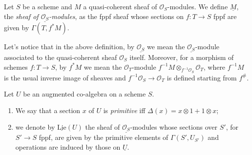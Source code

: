 \documentclass[../Main]{subfiles}
\begin{document}
\begin{defn}
	Let $S$ be a scheme and $M$ a quasi-coherent sheaf of $\mathcal{O}_{ S }$-modules.
	We define $\underline{M}$, the {\em sheaf of $\underline{\mathcal{O}_{ S }}$-modules},
	as the fppf sheaf whose sections on $f\colon T \to S$ fppf are given by
	$\Gamma(T, f^*M)$.
\end{defn}


\begin{rem}[]
	Let's notice that in the above definition, by $\underline{\mathcal{O}_{ S }}$
	we mean the $\underline{\mathcal{O}_{ S }}$-module associated to the 
	quasi-coherent sheaf $\mathcal{O}_{ S }$ itself.
	Moreover, for a morphism of schemes $f\colon T \to S$, by $f^* M$ we mean 
	the $\mathcal{O}_{ T }$-module $f^{-1} M \otimes_{f^{-1}\mathcal{O}_{ S }} \mathcal{O}_{ T }$,
	where $f^{-1} M$ is the usual inverse image of sheaves and
	$f^{-1}\mathcal{O}_{ S } \to \mathcal{O}_{ T }$ is defined starting from $f^\#$.
\end{rem}


\begin{defn}[]
	Let $U$ be an augmented co-algebra on a scheme $S$.
\begin{enumerate}
\item We say that a section $x$ of $U$ is {\em primitive} iff
	$\Delta(x) = x \otimes 1 + 1 \otimes x$;

\item we denote by $\underline{\mathrm{Lie}}(U)$ the sheaf of $\underline{\mathcal{O}_{ S }}$-modules
	whose sections over $S'$, for $S' \to S$ fppf, are given by the primitive
	elements of $\Gamma(S', U_{S'})$ and operations are induced by those on $\underline{U}$.
\end{enumerate}
\end{defn}
\end{document}
